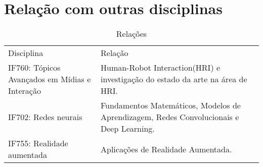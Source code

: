 \documentclass{article}
\begin{document}
\section{Relação com outras disciplinas}
\begin{table}[h]
 \centering
 {\renewcommand\arraystretch{1.25}
 \caption{Relações}
 \begin{tabular}{ l l }
  \cline{1-1}\cline{2-2}  
    \multicolumn{1}{|p{3.850cm}|}{Disciplina \centering } &
    \multicolumn{1}{p{4.217cm}|}{Relação \centering }
  \\  
  \cline{1-1}\cline{2-2}  
    \multicolumn{1}{|p{3.850cm}|}{IF760: Tópicos Avançados em Mídias e Interação  \citep{IF760}} &
    \multicolumn{1}{p{4.217cm}|}{Human-Robot Interaction(HRI) e investigação do estado da arte na área de HRI.}
  \\  
  \cline{1-1}\cline{2-2}  
    \multicolumn{1}{|p{3.850cm}|}{IF702: Redes neurais  \citep{IF702}} &
    \multicolumn{1}{p{4.217cm}|}{{Fundamentos Matemáticos, Modelos de Aprendizagem, Redes Convolucionais e Deep Learning.}}
  \\ 
  \cline{1-1}\cline{2-2}  
    \multicolumn{1}{|p{3.850cm}|}{IF755: Realidade aumentada  \citep{IF755}} &
    \multicolumn{1}{p{4.217cm}|}{Aplicações de Realidade Aumentada.}
  \\ 
  \hline

 \end{tabular} }
\end{table}



\end{document}
